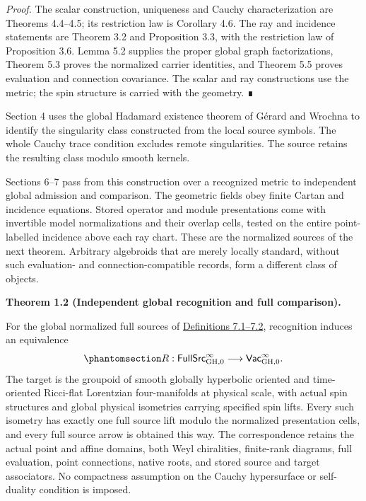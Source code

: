 \documentclass[
  english,
  11pt,
  reqno]{amsart}
\makeatletter
\newcommand{\pandocstatementheading}[1]{%
  \par\if@nobreak\else
    \addpenalty{\@beginparpenalty}%
    \addvspace{.5\baselineskip plus .2\baselineskip minus .2\baselineskip}%
  \fi
  {\normalfont\bfseries #1\par}%
  \nobreak\@afterindenttrue\@afterheading
}
\makeatother
\begin{document}
\emph{Proof.} The scalar construction, uniqueness and Cauchy
characterization are Theorems 4.4--4.5; its restriction law is Corollary
4.6. The ray and incidence statements are Theorem 3.2 and Proposition
3.3, with the restriction law of Proposition 3.6. Lemma 5.2 supplies the
proper global graph factorizations, Theorem 5.3 proves the normalized
carrier identities, and Theorem 5.5 proves evaluation and connection
covariance. The scalar and ray constructions use the metric; the spin
structure is carried with the geometry. ∎

Section 4 uses the global Hadamard existence theorem of Gérard and
Wrochna to identify the singularity class constructed from the local
source symbols. The whole Cauchy trace condition excludes remote
singularities. The source retains the resulting class modulo smooth
kernels.

Sections 6--7 pass from this construction over a recognized metric to
independent global admission and comparison. The geometric fields obey
finite Cartan and incidence equations. Stored operator and module
presentations come with invertible model normalizations and their
overlap cells, tested on the entire point-labelled incidence above each
ray chart. These are the normalized sources of the next theorem.
Arbitrary algebroids that are merely locally standard, without such
evaluation- and connection-compatible records, form a different class of
objects.

\pandocstatementheading{\protect{}\label{thm:global-normalized-correspondence-overview}Theorem 1.2 (Independent global recognition and full comparison).}

For the global normalized full sources of
\hyperref[def:global-independent-normalized-wave-packet]{Definitions
7.1--7.2}, recognition induces an equivalence
\begin{equation}\protect\phantomsection\label{eq:global-correspondence-overview}{
R:\mathsf{FullSrc}^{\infty}_{\mathrm{GH},0}
\longrightarrow\mathsf{Vac}^{\infty}_{\mathrm{GH},0}.
}\end{equation} The target is the groupoid of smooth globally hyperbolic
oriented and time-oriented Ricci-flat Lorentzian four-manifolds at
physical scale, with actual spin structures and global physical
isometries carrying specified spin lifts. Every such isometry has
exactly one full source lift modulo the normalized presentation cells,
and every full source arrow is obtained this way. The correspondence
retains the actual point and affine domains, both Weyl chiralities,
finite-rank diagrams, full evaluation, point connections, native roots,
and stored source and target associators. No compactness assumption on
the Cauchy hypersurface or self-duality condition is imposed.
\end{document}
